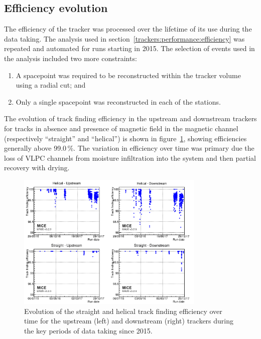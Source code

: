 \subsection{Efficiency evolution}

The efficiency of the tracker was processed over the lifetime of its use during the data taking. The analysis used in section~\ref{trackers:performance:efficiency} was repeated and automated for runs starting in 2015.
The selection of events used in the analysis included two more constraints:
\begin{enumerate}
  \item A spacepoint was required to be reconstructed within the tracker volume using a radial cut; and
  \item Only a single spacepoint was reconstructed in each of the stations.
\end{enumerate}

The evolution of track finding efficiency in the upstream and downstream trackers for tracks in absence and presence of magnetic field in the magnetic channel (respectively ``straight'' and ``helical'') is shown in figure~\ref{fig:trackers:performance:historical}, showing efficiencies generally above 99.0\,\%. The variation in efficiency over time was primary due the loss of VLPC channels from moisture infiltration into the system and then partial recovery with drying.


\begin{figure}
  \centering
  \includegraphics[width=0.80\textwidth]{historical_analysis_plot_logo.png}
  \caption{\label{fig:trackers:performance:historical} Evolution of the straight and helical track finding efficiency over time for the upstream (left) and downstream (right) trackers during the key periods of data taking since 2015.}
\end{figure}
